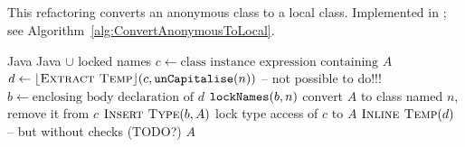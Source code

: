 \subsection{}
This refactoring converts an anonymous class to a local class. Implemented in ; see Algorithm~\ref{alg:ConvertAnonymousToLocal}.


\begin{algorithm}[p]
\caption{$\refactoring{Convert Anonymous to Local}(A : \type{AnonymousClass}, n : \type{Name}) : \type{LocalClass}$}\label{alg:ConvertAnonymousToLocal}
\begin{algorithmic}[1]
\REQUIRE Java
\ENSURE Java $\cup$ locked names
\medskip
\STATE $c \leftarrow \text{class instance expression containing $A$}$
\STATE $d \leftarrow \lfloor\textsc{Extract Temp}\rfloor(c, \text{\texttt{unCapitalise}}(n))$ -- not possible to do!!!
\STATE $b \leftarrow \text{enclosing body declaration of $d$}$
\STATE $\text{\texttt{lockNames}}(b, n)$
\STATE convert $A$ to class named $n$, remove it from $c$
\STATE $\textsc{Insert Type}(b, A)$
\STATE lock type access of $c$ to $A$
\STATE $\textsc{Inline Temp}(d)$ -- but without checks (TODO?)
\RETURN $A$
\end{algorithmic}
\end{algorithm}
